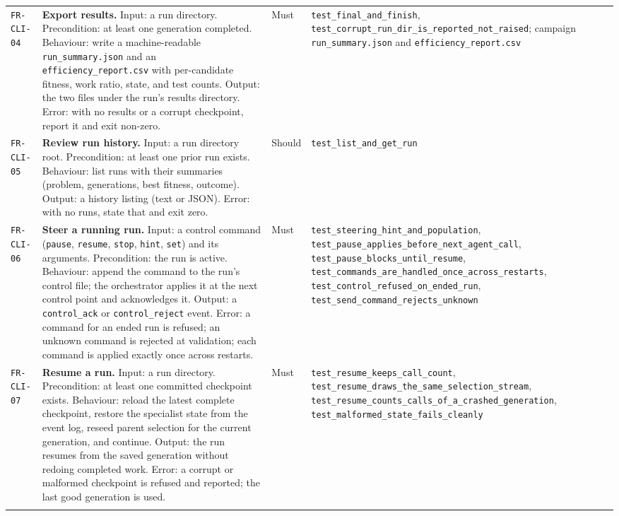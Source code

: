 \begin{longtable}{@{}>{\raggedright\arraybackslash}p{}>{\raggedright\arraybackslash}p{}p{}>{\raggedright\arraybackslash}p{}@{}}
\texttt{FR-CLI-04} & \textbf{Export results.} Input: a run directory.
Precondition: at least one generation completed. Behaviour: write a
machine-readable \texttt{run\_summary.json} and an
\texttt{efficiency\_report.csv} with per-candidate fitness, work ratio, state,
and test counts. Output: the two files under the run's results directory. Error:
with no results or a corrupt checkpoint, report it and exit non-zero. & Must &
\texttt{test\_final\_and\_finish},
\texttt{test\_corrupt\_run\_dir\_is\_reported\_not\_raised}; campaign \texttt{run\_summary.json} and
\texttt{efficiency\_report.csv} \\
\addlinespace[2pt]

\texttt{FR-CLI-05} & \textbf{Review run history.} Input: a run directory root.
Precondition: at least one prior run exists. Behaviour: list runs with their
summaries (problem, generations, best fitness, outcome). Output: a history
listing (text or JSON). Error: with no runs, state that and exit zero. & Should &
\texttt{test\_list\_and\_get\_run} \\
\addlinespace[2pt]

\texttt{FR-CLI-06} & \textbf{Steer a running run.} Input: a control command
(\texttt{pause}, \texttt{resume}, \texttt{stop}, \texttt{hint}, \texttt{set})
and its arguments. Precondition: the run is active. Behaviour: append the
command to the run's control file; the orchestrator applies it at the next
control point and acknowledges it. Output: a \texttt{control\_ack} or
\texttt{control\_reject} event. Error: a command for an ended run is refused; an
unknown command is rejected at validation; each command is applied exactly once
across restarts. & Must & \texttt{test\_steering\_hint\_and\_population},
\texttt{test\_pause\_applies\_before\_next\_agent\_call},
\texttt{test\_pause\_blocks\_until\_resume},
\texttt{test\_commands\_are\_handled\_once\_across\_restarts},
\texttt{test\_control\_refused\_on\_ended\_run},
\texttt{test\_send\_command\_rejects\_unknown} \\
\addlinespace[2pt]

\texttt{FR-CLI-07} & \textbf{Resume a run.} Input: a run directory. Precondition:
at least one committed checkpoint exists. Behaviour: reload the latest complete
checkpoint, restore the specialist state from the event log, reseed parent
selection for the current generation, and continue. Output: the run resumes from
the saved generation without redoing completed work. Error: a corrupt or
malformed checkpoint is refused and reported; the last good generation is used. &
Must & \texttt{test\_resume\_keeps\_call\_count},
\texttt{test\_resume\_draws\_the\_same\_selection\_stream},
\texttt{test\_resume\_counts\_calls\_of\_a\_crashed\_generation},
\texttt{test\_malformed\_state\_fails\_cleanly} \\
\addlinespace[2pt]


\end{longtable}
